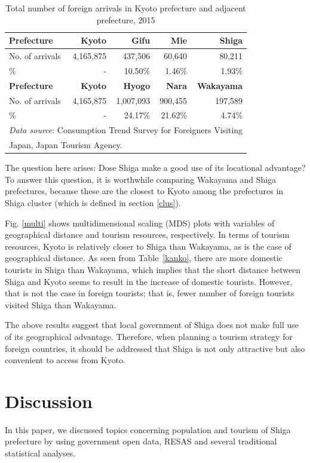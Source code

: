 \documentclass[10pt, conference, compsocconf]{IEEEtran}
\begin{document}
\begin{table}[!h]\caption{Total number of foreign arrivals in Kyoto prefecture and adjacent prefecture, 2015}
\label{percent}
\centering
\begin{tabular}{l|r|rrr}
\hline
\bf Prefecture & \bf Kyoto  & \bf Gifu  & \bf Mie  & \bf Shiga  \\\hline
No. of arrivals & 4,165,875 & 437,506 & 60,640 & 80,211\\
\% & - & 10.50\% & 1.46\% & 1.93\% \\\hline
\bf Prefecture & \bf Kyoto & \bf Hyogo  & \bf Nara  & \bf Wakayama  \\\hline
No. of arrivals & 4,165,875 & 1,007,093 & 900,455 & 197,589 \\
\% & - & 24.17\% & 21.62\% & 4.74\% \\\hline
\multicolumn{5}{l}{{\it Data source}: Consumption Trend Survey for Foreigners Visiting}\\
\multicolumn{5}{l}{Japan, Japan Tourism Agency.}
\end{tabular}
\end{table}

The question here arises: Dose Shiga make a good use of its locational advantage?
To answer this question, it is worthwhile comparing Wakayama and Shiga prefectures, 
because these are the closest to Kyoto among the 
prefectures in Shiga cluster (which is defined in section \ref{clus}). 


Fig. \ref{multi} shows multidimensional scaling (MDS) plots with variables of geographical distance and tourism resources, respectively.
In terms of tourism resources, Kyoto is relatively closer to Shiga than Wakayama, as is the case of geographical distance. As seen from Table~\ref{kanko}, there are more domestic tourists in Shiga than Wakayama,
which implies that the short distance between Shiga and Kyoto seems to 
result in the increase of domestic tourists.
However, that is not the case in foreign tourists; that is, 
fewer number of foreign tourists visited Shiga than Wakayama.

The above results suggest that local government of Shiga does not make full use of its geographical advantage. 
Therefore, when planning a tourism strategy for foreign countries, 
it should be addressed that Shiga is not only attractive but also convenient to access from Kyoto. 

\section{Discussion}\label{sec:discuss}
In this paper, we discussed topics concerning population and tourism of Shiga prefecture by using government open data, RESAS and several traditional statistical analyses. 
\end{document}
